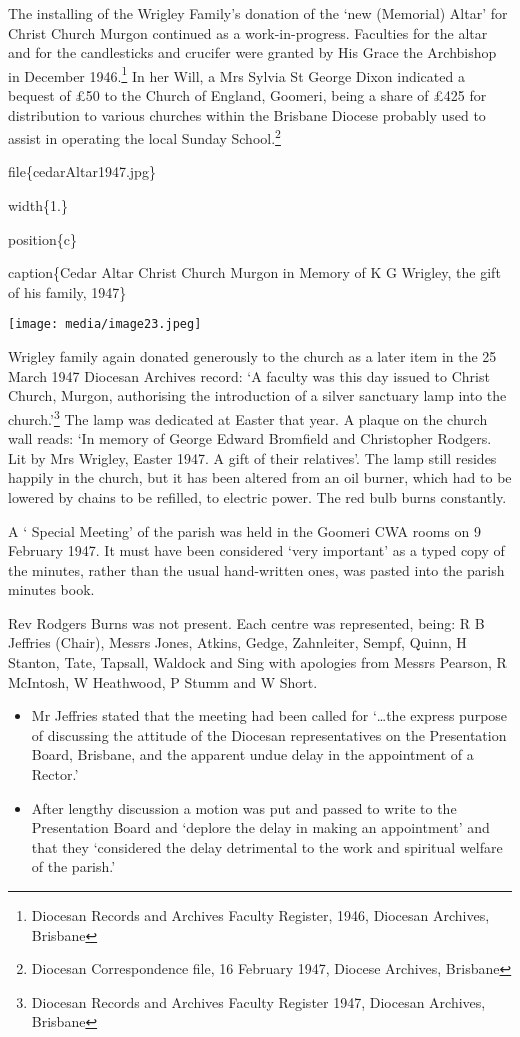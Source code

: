 The installing of the Wrigley Family's donation of the `new (Memorial) Altar' for Christ Church Murgon continued as a work-in-progress. Faculties for the altar and for the candlesticks and crucifer were granted by His Grace the Archbishop in December 1946.\footnote{Diocesan Records and Archives Faculty Register, 1946, Diocesan Archives, Brisbane} In her Will, a Mrs Sylvia St George Dixon indicated a bequest of £50 to the Church of England, Goomeri, being a share of £425 for distribution to various churches within the Brisbane Diocese probably used to assist in operating the local Sunday School.\footnote{Diocesan Correspondence file, 16 February 1947, Diocese Archives, Brisbane}

file\{cedarAltar1947.jpg\}

width\{1.\}

position\{c\}

caption\{Cedar Altar Christ Church Murgon in Memory of K G Wrigley, the gift of his family, 1947\}

\texttt{[image: media/image23.jpeg]}

Wrigley family again donated generously to the church as a later item in the 25 March 1947 Diocesan Archives record: `A faculty was this day issued to Christ Church, Murgon, authorising the introduction of a silver sanctuary lamp into the church.'\footnote{Diocesan Records and Archives Faculty Register 1947, Diocesan Archives, Brisbane} The lamp was dedicated at Easter that year. A plaque on the church wall reads: `In memory of George Edward Bromfield and Christopher Rodgers. Lit by Mrs Wrigley, Easter 1947. A gift of their relatives'. The lamp still resides happily in the church, but it has been altered from an oil burner, which had to be lowered by chains to be refilled, to electric power. The red bulb burns constantly.

A ` Special Meeting' of the parish was held in the Goomeri CWA rooms on 9 February 1947. It must have been considered `very important' as a typed copy of the minutes, rather than the usual hand-written ones, was pasted into the parish minutes book.

Rev Rodgers Burns was not present. Each centre was represented, being: R B Jeffries (Chair), Messrs Jones, Atkins, Gedge, Zahnleiter, Sempf, Quinn, H Stanton, Tate, Tapsall, Waldock and Sing with apologies from Messrs Pearson, R McIntosh, W Heathwood, P Stumm and W Short.

\begin{itemize}
\item
  Mr Jeffries stated that the meeting had been called for `\ldots the express purpose of discussing the attitude of the Diocesan representatives on the Presentation Board, Brisbane, and the apparent undue delay in the appointment of a Rector.'
\item
  After lengthy discussion a motion was put and passed to write to the Presentation Board and `deplore the delay in making an appointment' and that they `considered the delay detrimental to the work and spiritual welfare of the parish.'
\end{itemize}

